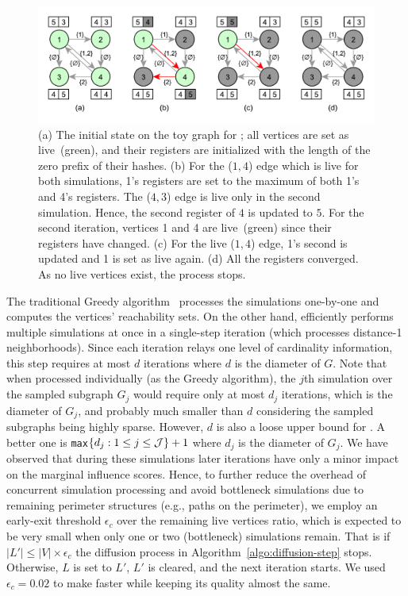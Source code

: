 \documentclass[review]{elsarticle}
\newcommand\acro{{\sc{HyperFuseR\xspace}\xspace}\xspace}
\begin{document}
 
\begin{figure}[!ht]
    \begin{center}
    \includegraphics[width=0.85\linewidth]{images/sketch-diffusion.pdf}
    \caption{\small{(a) The initial state on the toy graph for \acro{}; all vertices are set as live~(green), and their registers are initialized with the length of the zero prefix of their hashes. (b) 
    For the ($1, 4$) edge which is live for both simulations, 1's registers are set to the maximum of both 1's and 4's registers. The ($4, 3$) edge is live only in the second simulation. Hence, the second register of $4$ is updated to $5$. For the second iteration, vertices 1 and 4 are live~(green) since their registers have changed. (c) For the live ($1, 4$) edge, 1's second is updated and 1 is set as live again. (d) All the registers converged. As no live vertices exist, the process stops.}}\label{fig:hf-processing} 
    \end{center}
    \end{figure} 
 
The traditional Greedy algorithm~\cite{kempe2003maximizing} processes the simulations one-by-one and computes the vertices' reachability sets. On the other hand, \acro efficiently performs multiple simulations at once in a single-step iteration (which processes distance-1 neighborhoods). Since each iteration relays one level of cardinality information, this step requires at most $d$ iterations where $d$ is the diameter of $G$. Note that when processed individually (as the Greedy algorithm), the $j$th simulation over the sampled subgraph $G_j$ would require only at most $d_j$ iterations, which is the diameter of $G_j$, and probably much smaller than $d$ considering the sampled subgraphs being highly sparse. However, $d$ is also a loose upper bound for \acro. A better one is {\tt max}$\{d_j: 1 \leq j \leq {\cal J}\} + 1$ where $d_j$ is the diameter of $G_j$. We have observed that during these simulations later iterations have only a minor impact on the marginal influence scores. Hence, to further reduce the overhead of concurrent simulation processing and avoid bottleneck simulations due to remaining perimeter structures (e.g., paths on the perimeter), we employ an early-exit threshold $\epsilon_c$ over the remaining live vertices ratio, which is expected to be very small when only one or two (bottleneck) simulations remain. That is if $|L'| \leq |V| \times \epsilon_c$ the diffusion process in Algorithm~\ref{algo:diffusion-step} stops. Otherwise, $L$ is set to $L'$, $L'$ is cleared, and the next iteration starts. We used $\epsilon_c = 0.02$ to make \acro faster while keeping its quality almost the same.
\end{document}
